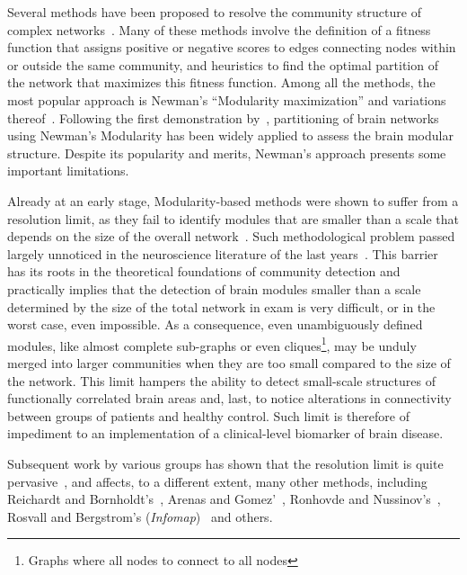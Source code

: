 Several methods have been proposed to resolve the community structure of complex networks~\cite{fortunato2010,lancichinetti2009,fortunato2016}.
Many of these methods involve the definition of a fitness function that assigns positive or negative scores to edges connecting nodes within or outside the same community, and heuristics to find the optimal partition of the network that maximizes this fitness function.
Among all the methods, the most popular approach is Newman's ``Modularity maximization'' and variations thereof~\cite{newman2006}.
Following the first demonstration by~\cite{schwarz2008}, partitioning of brain networks using Newman's Modularity has been widely applied to assess the brain modular structure.
Despite its popularity and merits, Newman's approach presents some important limitations.

Already at an early stage, Modularity-based methods were shown to suffer from a resolution limit, as they fail to identify modules that are smaller than a scale that depends on the size of the overall network~\cite{fortunato2007}.
Such methodological problem passed largely unnoticed in the neuroscience literature of the last years~\cite{articolimodularity}.
This barrier has its roots in the theoretical foundations of community detection and practically implies that the detection of brain modules smaller than a scale determined by the size of the total network in exam is very difficult, or in the worst case, even impossible. As a consequence, even unambiguously defined modules, like almost complete sub-graphs or even cliques\footnote{Graphs where all nodes to connect to all nodes}, may be unduly merged into larger communities when they are too small compared to the size of the network.
This limit hampers the ability to detect small-scale structures of functionally correlated brain areas and, last, to notice alterations in connectivity between groups of patients and healthy control. Such limit is therefore of impediment to an implementation of a clinical-level biomarker of brain disease.

Subsequent work by various groups has shown that the resolution limit is quite pervasive~\cite{lancichinetti2009,traag2011,squartini2015,lancichinetti2011,kawamoto2015}, and affects, to a different extent, many other methods, including Reichardt and Bornholdt’s~\cite{reichardt2006}, Arenas and Gomez'~\cite{arenas2008}, Ronhovde and Nussinov's~\cite{ronhovde2009}, Rosvall and Bergstrom's (\emph{Infomap})~\cite{rosvall2008,kawamoto2015} and others.

